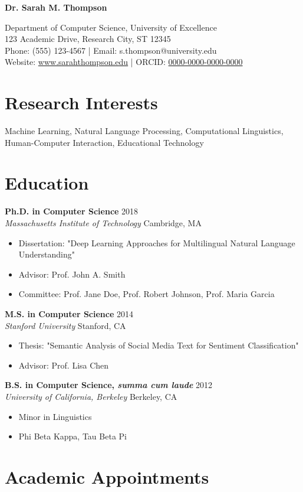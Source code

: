 \documentclass[11pt,letterpaper]{article}
\newcommand{\name}[1]{\begin{center}\textbf{\Large #1}\end{center}}
\newcommand{\contact}[1]{\begin{center}#1\end{center}}
\newcommand{\entry}[4]{\textbf{#1} \hfill #2 \\ \textit{#3} \hfill #4}
\begin{document}
\name{Dr. Sarah M. Thompson}

\contact{
Department of Computer Science, University of Excellence \\
123 Academic Drive, Research City, ST 12345 \\
Phone: (555) 123-4567 | Email: s.thompson@university.edu \\
Website: \href{https://www.sarahthompson.edu}{www.sarahthompson.edu} | 
ORCID: \href{https://orcid.org/0000-0000-0000-0000}{0000-0000-0000-0000}
}

\section{Research Interests}
Machine Learning, Natural Language Processing, Computational Linguistics, Human-Computer Interaction, Educational Technology

\section{Education}

\entry{Ph.D. in Computer Science}{2018}
{Massachusetts Institute of Technology}{Cambridge, MA}
\begin{itemize}[noitemsep]
    \item Dissertation: "Deep Learning Approaches for Multilingual Natural Language Understanding"
    \item Advisor: Prof. John A. Smith
    \item Committee: Prof. Jane Doe, Prof. Robert Johnson, Prof. Maria Garcia
\end{itemize}

\entry{M.S. in Computer Science}{2014}
{Stanford University}{Stanford, CA}
\begin{itemize}[noitemsep]
    \item Thesis: "Semantic Analysis of Social Media Text for Sentiment Classification"
    \item Advisor: Prof. Lisa Chen
\end{itemize}

\entry{B.S. in Computer Science, \textit{summa cum laude}}{2012}
{University of California, Berkeley}{Berkeley, CA}
\begin{itemize}[noitemsep]
    \item Minor in Linguistics
    \item Phi Beta Kappa, Tau Beta Pi
\end{itemize}

\section{Academic Appointments}
\end{document}
